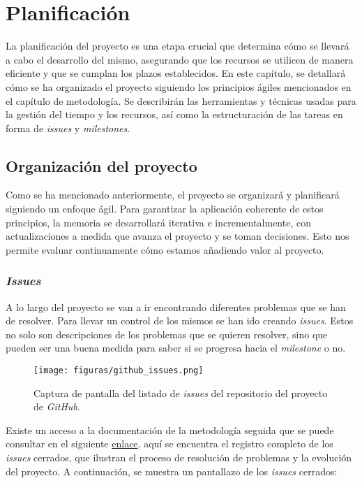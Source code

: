 \chapter{Planificación}

La planificación del proyecto es una etapa crucial que determina cómo se llevará a cabo el desarrollo del mismo, asegurando que los recursos se utilicen de manera eficiente y que se cumplan los plazos establecidos. En este capítulo, se detallará cómo se ha organizado el proyecto siguiendo los principios ágiles mencionados en el capítulo de metodología. Se describirán las herramientas y técnicas usadas para la gestión del tiempo y los recursos, así como la estructuración de las tareas en forma de \textit{issues} y \textit{milestones}.

\section{Organización del proyecto}

Como se ha mencionado anteriormente, el proyecto se organizará y planificará siguiendo un enfoque ágil. Para garantizar la aplicación coherente de estos principios, la memoria se desarrollará iterativa e incrementalmente, con actualizaciones a medida que avanza el proyecto y se toman decisiones. Esto nos permite evaluar continuamente cómo estamos añadiendo valor al proyecto.

\subsection{\textit{Issues}}

A lo largo del proyecto se van a ir encontrando diferentes problemas que se han de resolver. Para llevar un control de los mismos se han ido creando \textit{issues}. Estos no solo son descripciones de los problemas que se quieren resolver, sino que pueden ser una buena medida para saber si se progresa hacia el \textit{milestone} o no.

\begin{figure}[H]
    \caption{Captura de pantalla del listado de \textit{issues} del repositorio del proyecto de \textit{GitHub}.}
    \centering
    \vspace*{0.5cm}
    \texttt{[image: figuras/github\_issues.png]}
\end{figure}

Existe un acceso a la documentación de la metodología seguida que se puede consultar en el siguiente \href{https://github.com/danigonzser/proyecto-tfg/issues?q=is%3Aissue+is%3Aclosed}{enlace}, aquí se encuentra el registro completo de los \textit{issues} cerrados, que ilustran el proceso de resolución de problemas y la evolución del proyecto. A continuación, se muestra un pantallazo de los \textit{issues} cerrados:

